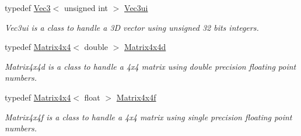 \begin{DoxyCompactItemize}
typedef \hyperlink{class_math_1_1_vec3}{Vec3}$<$ unsigned int $>$ \hyperlink{namespace_utilities_ad931f5df25ecb686d1b3aea12bdc9d06}{Vec3ui}
\begin{DoxyCompactList}\small\item\em Vec3ui is a class to handle a 3D vector using unsigned 32 bits integers. \end{DoxyCompactList}\item 
typedef \hyperlink{class_math_1_1_matrix4x4}{Matrix4x4}$<$ double $>$ \hyperlink{namespace_utilities_a1f0db90cea8d87567b4dd719ffd7d274}{Matrix4x4d}
\begin{DoxyCompactList}\small\item\em Matrix4x4d is a class to handle a 4x4 matrix using double precision floating point numbers. \end{DoxyCompactList}\item 
typedef \hyperlink{class_math_1_1_matrix4x4}{Matrix4x4}$<$ float $>$ \hyperlink{namespace_utilities_a468a3c0ce8ea13f2b50bbc872a7a4bb7}{Matrix4x4f}
\begin{DoxyCompactList}\small\item\em Matrix4x4f is a class to handle a 4x4 matrix using single precision floating point numbers. \end{DoxyCompactList}\end{DoxyCompactItemize}
